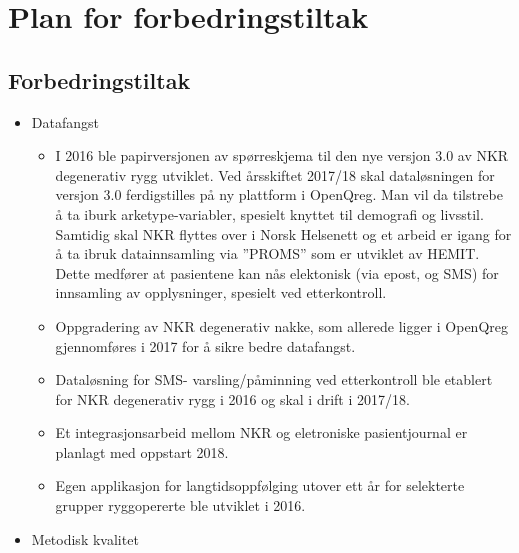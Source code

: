 \documentclass[norsk, a4paper, twocolumn]{report}
\begin{document}
\onecolumn


\part{Plan for forbedringstiltak}\label{par:for}


\chapter{Forbedringstiltak}


\begin{itemize}
  \item Datafangst
    \begin{itemize}
      \item I 2016 ble papirversjonen av spørreskjema til den nye versjon 3.0 av NKR degenerativ rygg utviklet. Ved årsskiftet 2017/18 skal dataløsningen for versjon 3.0 ferdigstilles på ny plattform i OpenQreg. Man vil da tilstrebe å ta iburk arketype-variabler, spesielt knyttet til demografi og livsstil. Samtidig skal NKR flyttes over i Norsk Helsenett og et arbeid er igang for å ta ibruk datainnsamling via ''PROMS''  som er utviklet av HEMIT. Dette medfører at pasientene kan nås elektonisk (via epost, og SMS) for innsamling av opplysninger, spesielt ved etterkontroll. \item Oppgradering av NKR degenerativ nakke, som allerede ligger i OpenQreg gjennomføres i 2017 for å sikre bedre datafangst. \item Dataløsning for SMS- varsling/påminning ved etterkontroll ble etablert for NKR degenerativ rygg i 2016 og skal i drift i 2017/18. \item Et integrasjonsarbeid mellom NKR og  eletroniske pasientjournal er planlagt med oppstart 2018.
      \item Egen applikasjon for langtidsoppfølging utover ett år for selekterte grupper ryggopererte ble utviklet i 2016.
    \end{itemize}
  \item Metodisk kvalitet
    \begin{itemize}
    

\end{itemize}
\end{itemize}
\end{document}
